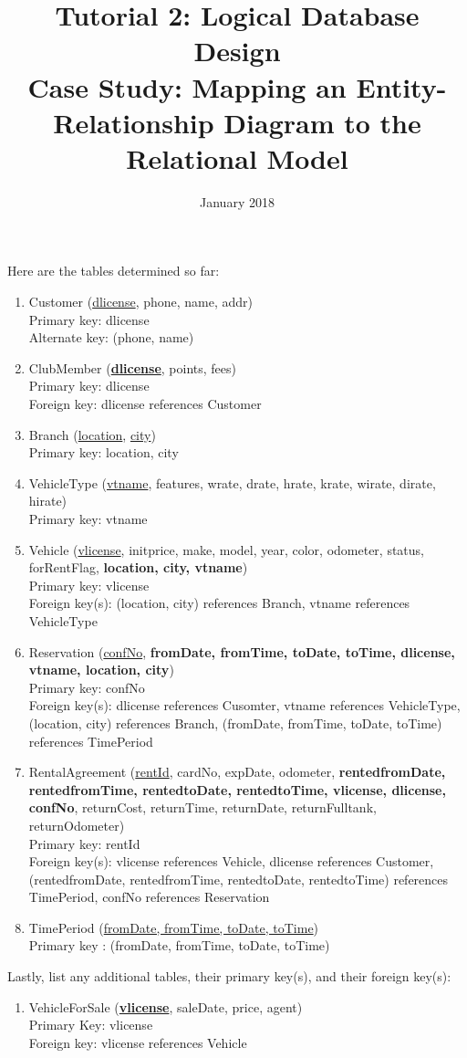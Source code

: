 \documentclass{article}
\title{%
	Tutorial 2: Logical Database Design \\
	\large Case Study: Mapping an Entity-Relationship Diagram to the Relational Model}
\date{January 2018}
\begin{document}
	\maketitle
	Here are the tables determined so far:
	\begin{enumerate}
		\item Customer (\underline{dlicense}, phone, name, addr) \\ 
			Primary key: dlicense \\ 
			Alternate key: (phone, name)

		\item ClubMember (\textbf{\underline{dlicense}}, points, fees)\\
			Primary key: dlicense \\
			Foreign key: dlicense references Customer

		\item Branch (\underline{location}, \underline{city}) \\
			Primary key: location, city

		\item VehicleType (\underline{vtname}, features, wrate, drate, hrate, krate, wirate, dirate, hirate) \\
			Primary key: vtname

		\item Vehicle (\underline{vlicense}, initprice, make, model, year, color, odometer, status, forRentFlag, \textbf{location, city, vtname}) \\
			Primary key: vlicense \\
			Foreign key(s): (location, city) references Branch, vtname references VehicleType

		\item Reservation (\underline{confNo}, \textbf{fromDate, fromTime, toDate, toTime, dlicense, vtname, location, city})\\
			Primary key: confNo \\
			Foreign key(s): dlicense references Cusomter, vtname references VehicleType, (location, city) references Branch, (fromDate, fromTime, toDate, toTime) references TimePeriod

		\item RentalAgreement (\underline{rentId}, cardNo, expDate, odometer, \textbf{rentedfromDate, rentedfromTime, rentedtoDate, rentedtoTime, vlicense, dlicense, confNo}, returnCost, returnTime, returnDate, returnFulltank, returnOdometer) \\
			Primary key: rentId \\
			Foreign key(s): vlicense references Vehicle, dlicense references Customer, (rentedfromDate, rentedfromTime, rentedtoDate, rentedtoTime) references TimePeriod, confNo references Reservation

		\item TimePeriod (\underline{fromDate, fromTime, toDate, toTime}) \\
			Primary key : (fromDate, fromTime, toDate, toTime)

	\end{enumerate}
	Lastly, list any additional tables, their primary key(s), and their foreign key(s):
	\begin{enumerate}
		\item VehicleForSale (\textbf{\underline{vlicense}}, saleDate, price, agent) \\
			Primary Key: vlicense \\
			Foreign key: vlicense references Vehicle
	\end{enumerate}
	
\end{document}
